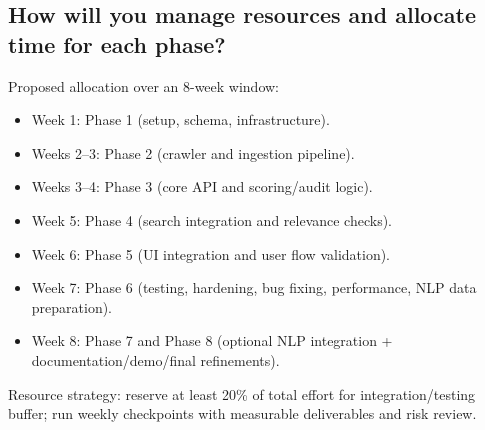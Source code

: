 \documentclass[12pt,a4paper]{article}
\begin{document}
\subsection{How will you manage resources and allocate time for each phase?}
Proposed allocation over an 8-week window:
\begin{itemize}[leftmargin=*]
	\item Week 1: Phase 1 (setup, schema, infrastructure).
	\item Weeks 2--3: Phase 2 (crawler and ingestion pipeline).
	\item Weeks 3--4: Phase 3 (core API and scoring/audit logic).
	\item Week 5: Phase 4 (search integration and relevance checks).
	\item Week 6: Phase 5 (UI integration and user flow validation).
	\item Week 7: Phase 6 (testing, hardening, bug fixing, performance, NLP data preparation).
	\item Week 8: Phase 7 and Phase 8 (optional NLP integration + documentation/demo/final refinements).
\end{itemize}
Resource strategy: reserve at least 20\% of total effort for integration/testing buffer; run weekly checkpoints with measurable deliverables and risk review.
\end{document}
